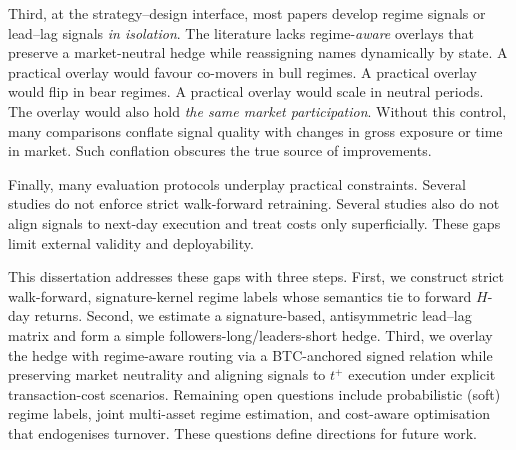 Third, at the strategy--design interface, most papers develop regime signals or lead--lag signals \emph{in isolation}. The literature lacks regime-\emph{aware} overlays that preserve a market-neutral hedge while reassigning names dynamically by state. A practical overlay would favour co-movers in bull regimes. A practical overlay would flip in bear regimes. A practical overlay would scale in neutral periods. The overlay would also hold \emph{the same market participation}. Without this control, many comparisons conflate signal quality with changes in gross exposure or time in market. Such conflation obscures the true source of improvements.

Finally, many evaluation protocols underplay practical constraints. Several studies do not enforce strict walk-forward retraining. Several studies also do not align signals to next-day execution and treat costs only superficially. These gaps limit external validity and deployability.

This dissertation addresses these gaps with three steps. First, we construct strict walk-forward, signature-kernel regime labels whose semantics tie to forward $H$-day returns. Second, we estimate a signature-based, antisymmetric lead--lag matrix and form a simple followers-long/leaders-short hedge. Third, we overlay the hedge with regime-aware routing via a BTC-anchored signed relation while preserving market neutrality and aligning signals to $t^+$ execution under explicit transaction-cost scenarios. Remaining open questions include probabilistic (soft) regime labels, joint multi-asset regime estimation, and cost-aware optimisation that endogenises turnover. These questions define directions for future work.
